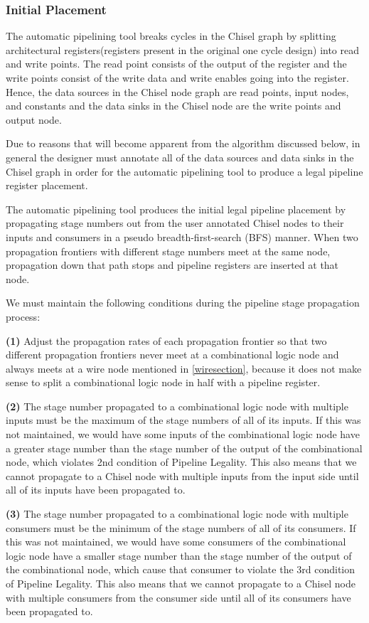 \subsubsection{Initial Placement}
The automatic pipelining tool breaks cycles in the Chisel graph by splitting architectural registers(registers present in the original one cycle design) into read and write points. The read point consists of the output of the register and the write points consist of the write data and write enables going into the register. Hence, the data sources in the Chisel node graph are read points, input nodes, and constants and the data sinks in the Chisel node are the write points and output node.

Due to reasons that will become apparent from the algorithm discussed below, in general the designer must annotate all of the data sources and data sinks in the Chisel graph in order for the automatic pipelining tool to produce a legal pipeline register placement.

The automatic pipelining tool produces the initial legal pipeline placement by propagating stage numbers out from the user annotated Chisel nodes to their inputs and consumers in a pseudo breadth-first-search (BFS) manner. When two propagation frontiers with different stage numbers meet at the same node, propagation down that path stops and pipeline registers are inserted at that node.

We must maintain the following conditions during the pipeline stage propagation process:

{\bf (1)} Adjust the propagation rates of each propagation frontier so that two different propagation frontiers never meet at a combinational logic node and always meets at a wire node mentioned in \ref{wiresection}, because it does not make sense to split a combinational logic node in half with a pipeline register.

{\bf (2)}  The stage number propagated to a combinational logic node with multiple inputs must be the maximum of the stage numbers of all of its inputs. If this was not maintained, we would have some inputs of the combinational logic node have a greater stage number than the stage number of the output of the combinational node, which violates 2nd condition of Pipeline Legality. This also means that we cannot propagate to a Chisel node with multiple inputs from the input side until all of its inputs have been propagated to.

{\bf (3)} The stage number propagated to a combinational logic node with multiple consumers must be the minimum of the stage numbers of all of its consumers. If this was not maintained, we would have some consumers of the combinational logic node have a smaller stage number than the stage number of the output of the combinational node, which cause that consumer to violate the 3rd condition of Pipeline Legality. This also means that we cannot propagate to a Chisel node with multiple consumers from the consumer side until all of its consumers have been propagated to.

